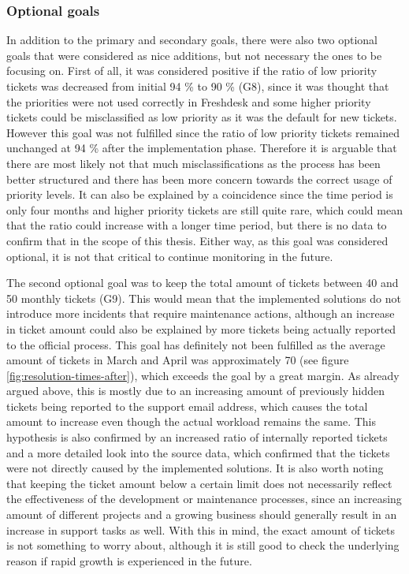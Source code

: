 \subsubsection*{Optional goals}

In addition to the primary and secondary goals, there were also two optional goals that were considered as nice additions, but not necessary the ones to be focusing on. First of all, it was considered positive if
the ratio of low priority tickets was decreased from initial 94 \% to 90 \% (G8), since it was thought that the priorities were not used correctly in Freshdesk and some higher priority tickets could be
misclassified as low priority as it was the default for new tickets. However this goal was not fulfilled since the ratio of low priority tickets remained unchanged at 94 \% after the implementation phase.
Therefore it is arguable that there are most likely not that much misclassifications as the process has been better structured and there has been more concern towards the correct usage of priority levels.
It can also be explained by a coincidence since the time period is only four months and higher priority tickets are still quite rare, which could mean that the ratio could increase with a longer time period,
but there is no data to confirm that in the scope of this thesis. Either way, as this goal was considered optional, it is not that critical to continue monitoring in the future.

The second optional goal was to keep the total amount of tickets between 40 and 50 monthly tickets (G9). This would mean that the implemented solutions do not introduce more incidents that require
maintenance actions, although an increase in ticket amount could also be explained by more tickets being actually reported to the official process. This goal has definitely not been fulfilled as the average
amount of tickets in March and April was approximately 70 (see figure \ref{fig:resolution-times-after}), which exceeds the goal by a great margin.
As already argued above, this is mostly due to an increasing amount of previously hidden tickets being
reported to the support email address, which causes the total amount to increase even though the actual workload remains the same. This hypothesis is also confirmed by an increased ratio of internally
reported tickets and a more detailed look into the source data, which confirmed that the tickets were not directly caused by the implemented solutions. It is also worth noting that keeping the ticket amount below
a certain limit does not necessarily reflect the effectiveness of the development or maintenance processes, since an increasing amount of different projects and a growing business should generally result in
an increase in support tasks as well. With this in mind, the exact amount of tickets is not something to worry about, although it is still good to check the underlying reason if rapid growth is experienced
in the future.

